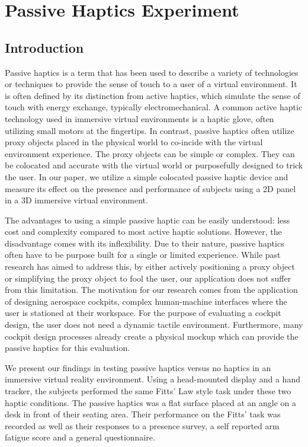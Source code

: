 \chapter{Passive Haptics Experiment}
\label{chap:ph_exp}

\section{Introduction}

Passive haptics is a term that has been used to describe a variety of technologies or techniques to provide the sense of touch to a user of a virtual environment.
It is often defined by its distinction from active haptics, which simulate the sense of touch with energy exchange, typically electromechanical.
A common active haptic technology used in immersive virtual environments is a haptic glove, often utilizing small motors at the fingertips.
In contrast, passive haptics often utilize proxy objects placed in the physical world to co-incide with the virtual environment experience.
The proxy objects can be simple or complex.
They can be colocated and accurate with the virtual world or purposefully designed to trick the user.
In our paper, we utilize a simple colocated passive haptic device and measure its effect on the presence and performance of subjects using a 2D panel in a 3D immersive virtual environment.

The advantages to using a simple passive haptic can be easily understood: less cost and complexity compared to most active haptic solutions.
However, the disadvantage comes with its inflexibility.
Due to their nature, passive haptics often have to be purpose built for a single or limited experience.
While past research has aimed to address this, by either actively positioning a proxy object or simplifying the proxy object to fool the user, our application does not suffer from this limitation.
The motivation for our research comes from the application of designing aerospace cockpits, complex human-machine interfaces where the user is stationed at their workspace.
For the purpose of evaluating a cockpit design, the user does not need a dynamic tactile environment.
Furthermore, many cockpit design processes already create a physical mockup which can provide the passive haptics for this evaluation.

We present our findings in testing passive haptics versus no haptics in an immersive virtual reality environment.
Using a head-mounted display and a hand tracker, the subjects performed the same Fitts' Law style task under these two haptic conditions.
The passive haptics was a flat surface placed at an angle on a desk in front of their seating area.
Their performance on the Fitts' task was recorded as well as their responses to a presence survey, a self reported arm fatigue score and a general questionnaire.

